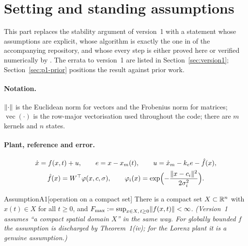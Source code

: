 
\section{Setting and standing assumptions}\label{sec:p1-setting}

This part replaces the stability argument of version~1 with a statement whose assumptions are explicit, whose
algorithm is exactly the one in  of the accompanying repository, and whose every step is either proved
here or verified numerically by . The errata to version~1 are listed in
Section~\ref{sec:version1}; Section~\ref{sec:p1-prior} positions the result against prior work.

\paragraph{Notation.} $\lVert \cdot\rVert$ is the Euclidean norm for vectors and the Frobenius norm for matrices;
$\operatorname{vec}(\cdot)$ is the row-major vectorisation used throughout the code; there are $m$ kernels and $n$
states.

\paragraph{Plant, reference and error.}
\begin{gather}
\dot x = f(x,t)+u,\qquad e = x-x_m(t),\qquad u = \dot x_m-k_e e-\hat f(x),\label{eq:part1:plant}\\
\hat f(x) = W^\top\varphi(x,c,\sigma),\qquad
\varphi_i(x) = \exp\Bigl(-\frac{\lVert x-c_i\rVert^2}{2\sigma_i^2}\Bigr).\label{eq:part1:network}
\end{gather}

\begin{rmk}{Assumption}{A1}[operation on a compact set]
There is a compact set $X\subset\mathbb{R}^n$ with $x(t)\in X$ for all $t\ge0$, and
$F_{\max}:=\sup_{x\in X,\,t\ge0}\lVert f(x,t)\rVert<\infty$.
\emph{(Version~1 assumes ``a compact spatial domain $X$'' in the same way. For globally bounded $f$ the assumption is
discharged by Theorem~1(iv); for the Lorenz plant it is a genuine assumption.)}
\end{rmk}


